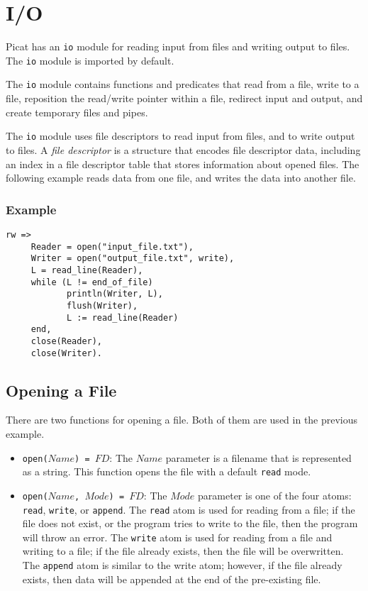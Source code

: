 \chapter{\label{chapter:io}I/O}
Picat has an \texttt{io} module for reading input from files and writing output to files.  The \texttt{io} module is imported by default.

The \texttt{io} module contains functions and predicates that read from a file, write to a file, reposition the read/write pointer within a file, redirect input and output, and create temporary files and pipes.

The \texttt{io} module uses file descriptors to read input from files, and to write output to files.  A \emph{file descriptor} is a structure that encodes file descriptor data, including an index in a file descriptor table that stores information about opened files.  The following example reads data from one file, and writes the data into another file.

\subsection*{Example}
\begin{verbatim}
rw =>
     Reader = open("input_file.txt"),
     Writer = open("output_file.txt", write),
     L = read_line(Reader),
     while (L != end_of_file)
            println(Writer, L),
            flush(Writer),
            L := read_line(Reader)
     end,
     close(Reader),
     close(Writer).
\end{verbatim}

\section{Opening a File}
There are two functions for opening a file.  Both of them are used in the previous example.
\begin{itemize}
\item \texttt{open($Name$) = $FD$}: The $Name$ parameter is a filename that is represented as a string.  This function opens the file with a default \texttt{read} mode.
\item \texttt{open($Name$, $Mode$) = $FD$}: The $Mode$ parameter is one of the four atoms: \texttt{read}, \texttt{write}, or \texttt{append}.  The \texttt{read} atom is used for reading from a file; if the file does not exist, or the program tries to write to the file, then the program will throw an error.  The \texttt{write} atom is used for reading from a file and writing to a file; if the file already exists, then the file will be overwritten.  The \texttt{append} atom is similar to the write atom; however, if the file already exists, then data will be appended at the end of the pre-existing file.  
\end{itemize}


